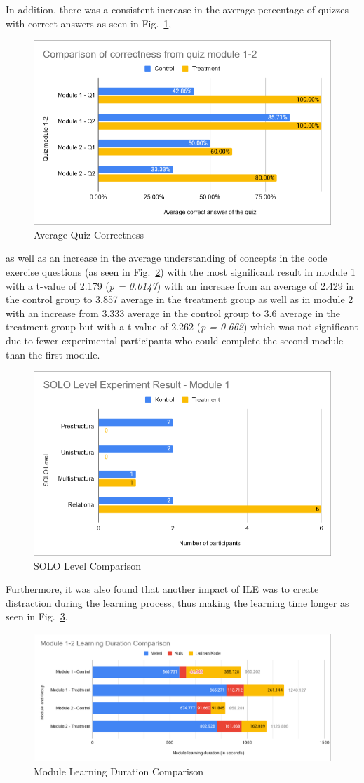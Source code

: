 \documentclass[conference]{IEEEtran}
\begin{document}
In addition, there was a consistent increase in the average percentage of quizzes with correct answers as seen in Fig.~\ref{fig:eksperimen-k1k2-kebenaran-awam-paper},
\begin{figure}[htbp]
  \centerline{\includegraphics[width=0.6\linewidth]{chapter4/eksperimen-k1k2-kebenaran-awam-paper.png}}
  \caption{Average Quiz Correctness} \label{fig:eksperimen-k1k2-kebenaran-awam-paper}
\end{figure}
as well as an increase in the average understanding of concepts in the code exercise questions (as seen in Fig.~\ref{fig:eksperimen-lk1-awam-paper}) with the most significant result in module 1 with a t-value of 2.179 (\textit{p = 0.0147}) with an increase from an average of 2.429 in the control group to 3.857 average in the treatment group as well as in module 2 with an increase from 3.333 average in the control group to 3.6 average in the treatment group but with a t-value of 2.262 (\textit{p = 0.662}) which was not significant due to fewer experimental participants who could complete the second module than the first module.
\begin{figure}[htbp]
  \centerline{\includegraphics[width=0.6\linewidth]{chapter4/eksperimen-lk1-awam-paper.png}}
  \caption{SOLO Level Comparison} \label{fig:eksperimen-lk1-awam-paper}
\end{figure}
Furthermore, it was also found that another impact of ILE was to create distraction during the learning process, thus making the learning time longer as seen in Fig.~\ref{fig:eksperimen-m1m2-waktu-paper}.
\begin{figure}[htbp]
  \centerline{\includegraphics[width=0.6\linewidth]{chapter4/eksperimen-m1m2-waktu-paper.png}}
  \caption{Module Learning Duration Comparison} \label{fig:eksperimen-m1m2-waktu-paper}
\end{figure}
\end{document}
